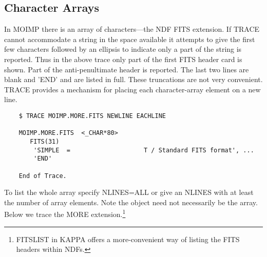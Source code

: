 \subsection{Character Arrays}
In MOIMP there is an array of characters---the NDF FITS extension.
If {\small TRACE} cannot accommodate a string in the space available it
attempts to give the first few characters followed by an ellipsis to
indicate only a part of the string is reported.  Thus in the
above trace only part of the first FITS header card is shown.  Part of
the anti-penultimate header is reported.  The last two lines are blank and
'END' and are listed in full.  These truncations are not very convenient.
{\small TRACE} provides a mechanism for placing each character-array element
on a new line.
\small
\begin{verbatim}
    $ TRACE MOIMP.MORE.FITS NEWLINE EACHLINE

    MOIMP.MORE.FITS  <_CHAR*80>
       FITS(31)  
        'SIMPLE  =                    T / Standard FITS format', ...
        'END'

    End of Trace.
\end{verbatim}
\normalsize
To list the whole array specify NLINES=ALL or give an NLINES with at 
least the number of array elements.  Note the object need not 
necessarily be the array.  Below we trace the MORE extension.\footnote{
FITSLIST in {\small KAPPA} offers a more-convenient way of listing the
FITS headers within NDFs.}
\small
